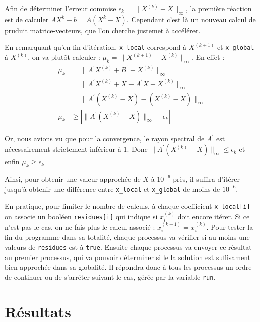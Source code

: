 \documentclass[11pt, a4paper]{article}
\begin{document}
Afin de déterminer l'erreur commise \(\epsilon_k = \|X^{(k)} - X \|_\infty\), la première réaction est de calculer \(AX^{k}-b = A(X^{k}-X)\).
Cependant c'est là un nouveau calcul de pruduit matrice-vecteurs, que l'on cherche justemet à accélérer.

En remarquant qu'en fin d'itération, \lstinline{x_local} correspond à \(X^{(k+1)}\) et \lstinline{x_global} à \(X^{(k)}\), on va plutôt calculer :
\(    \mu_k = \| X^{(k+1)} - X^{(k)} \|_\infty \).
En effet :
\begin{align*}
    \mu_k &= \| A^\prime X^{(k)} + B^\prime - X^{(k)} \|_\infty \\
    &= \| A^\prime X^{(k)} + X - A^\prime X- X^{(k)} \|_\infty \\
    &= \| A^\prime (X^{(k)} - X) - ( X^{(k)} - X ) \|_\infty \\
    \mu_k &\geq \left| \| A^\prime (X^{(k)} - X) \|_\infty - \epsilon_k \right|
\end{align*}

Or, nous avions vu que pour la convergence, le rayon spectral de \(A^\prime\) est nécessairement strictement inférieur à 1.
Donc \(\| A^\prime (X^{(k)} - X) \|_\infty \leq \epsilon_k \) et enfin
\(\mu_k \geq \epsilon_k\)

Ainsi, pour obtenir une valeur approchée de \(X\) à \(10^{-6}\) près,
il suffira d'itérer jusqu'à obtenir une différence entre \lstinline{x_local}
et \lstinline{x_global} de moins de \(10^{-6}\).

\bigskip

En pratique, pour limiter le nombre de calculs, à chaque coefficient
\lstinline{x_local[i]} on associe un booléen \lstinline{residues[i]}
qui indique si \(x^{(k)}_i\) doit encore itérer.
Si ce n'est pas le cas, on ne fais plus le calcul associé : \(x^{(k+1)}_i = x^{(k)}_i\).
Pour tester la fin du programme dans sa totalité, chaque processus va vérifier
si au moins une valeurs de \lstinline{residues} est à \lstinline{true}.
Ensuite chaque processus va envoyer ce résultat au premier processus, qui va pouvoir déterminer si le la solution est suffisament bien approchée dans sa globalité.
Il répondra donc à tous les processus un ordre de continuer ou de s'arréter suivant le cas, gérée par la variable \lstinline{run}.

\newpage
\section{Résultats}
\end{document}
